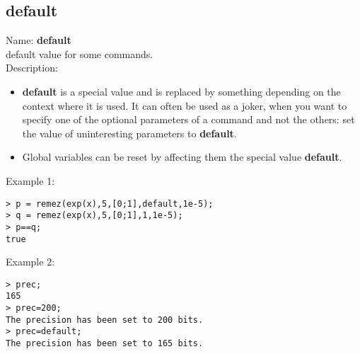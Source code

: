 \subsection{default}
\label{labdefault}
\noindent Name: \textbf{default}\\
default value for some commands.\\

\noindent Description: \begin{itemize}

\item \textbf{default} is a special value and is replaced by something depending on the 
   context where it is used. It can often be used as a joker, when you want to 
   specify one of the optional parameters of a command and not the others: set 
   the value of uninteresting parameters to \textbf{default}.

\item Global variables can be reset by affecting them the special value \textbf{default}.
\end{itemize}
\noindent Example 1: 
\begin{center}\begin{minipage}{15cm}\begin{Verbatim}[frame=single]
> p = remez(exp(x),5,[0;1],default,1e-5);
> q = remez(exp(x),5,[0;1],1,1e-5);
> p==q;
true
\end{Verbatim}
\end{minipage}\end{center}
\noindent Example 2: 
\begin{center}\begin{minipage}{15cm}\begin{Verbatim}[frame=single]
> prec;
165
> prec=200;
The precision has been set to 200 bits.
> prec=default;
The precision has been set to 165 bits.
\end{Verbatim}
\end{minipage}\end{center}
